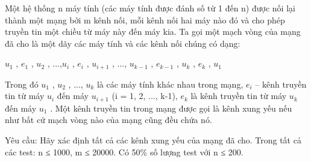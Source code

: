Một hệ thống n máy tính (các máy tính được đánh số từ 1 đến n) được nối lại thành một mạng bởi m kênh nối, mỗi kênh nối hai máy nào đó và cho phép truyền tin một chiều từ máy này đến máy kia. Ta gọi một mạch vòng của mạng đã cho là một dãy các máy tính và các kênh nối chúng có dạng:

$u_{1}$ , $e_{1}$ , $u_{2}$ , ...,$u_{i}$ , $e_{i}$ , $u_{i+1}$ , ..., $u_{k-1}$ , $e_{k-1}$ , $u_{k}$ , $e_{k}$ , $u_{1}$

Trong đó $u_{1}$ , $u_{2}$ , ..., $u_{k}$ là các máy tính khác nhau trong mạng, $e_{i}$ – kênh truyền tin từ máy $u_{i}$ đến máy $u_{i+1}$ (i = 1, 2, ..., k-1), $e_{k}$ là kênh truyền tin từ máy $u_{k}$ đến máy $u_{1}$ . Một kênh truyền tin trong mạng được gọi là kênh xung yếu nếu như bất cứ mạch vòng nào của mạng cũng đều chứa nó.

Yêu cầu: Hãy xác định tất cả các kênh xung yếu của mạng đã cho.
Trong tất cả các test: n ≤ 1000, m ≤ 20000. Có 50\% số lượng test với n ≤ 200.